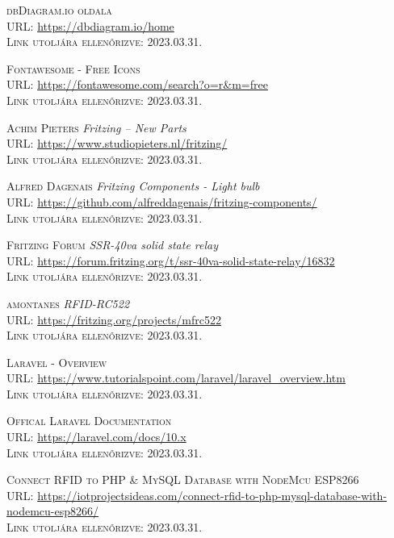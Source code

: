 \documentclass[
]{thesis-ekf}
\theoremstyle{definition}
\theoremstyle{remark}
\begin{document}
\begin{thebibliography}{20}
		\textsc{dbDiagram.io oldala}\\
		\textsc{URL:} \url{https://dbdiagram.io/home}\\
		\textsc{Link utoljára ellenőrizve:} 2023.03.31.
		
		\textsc{Fontawesome - Free Icons}\\
		\textsc{URL:} \url{https://fontawesome.com/search?o=r&m=free}\\
		\textsc{Link utoljára ellenőrizve:} 2023.03.31.
		
		\textsc{Achim Pieters} \emph{Fritzing – New Parts}\\
		\textsc{URL:} \url{https://www.studiopieters.nl/fritzing/}\\
		\textsc{Link utoljára ellenőrizve:} 2023.03.31.
		
		\textsc{Alfred Dagenais} \emph{Fritzing Components - Light bulb}\\
		\textsc{URL:} \url{https://github.com/alfreddagenais/fritzing-components/}\\
		\textsc{Link utoljára ellenőrizve:} 2023.03.31.
		
		\textsc{Fritzing Forum} \emph{SSR-40va solid state relay}\\
		\textsc{URL:} \url{https://forum.fritzing.org/t/ssr-40va-solid-state-relay/16832}\\
		\textsc{Link utoljára ellenőrizve:} 2023.03.31.
		
		\textsc{amontanes} \emph{RFID-RC522}\\
		\textsc{URL:} \url{https://fritzing.org/projects/mfrc522}\\
		\textsc{Link utoljára ellenőrizve:} 2023.03.31.
		
		\textsc{Laravel - Overview}\\
		\textsc{URL:} \url{https://www.tutorialspoint.com/laravel/laravel_overview.htm}\\
		\textsc{Link utoljára ellenőrizve:} 2023.03.31.
		
		\textsc{Offical Laravel Documentation}\\
		\textsc{URL:} \url{https://laravel.com/docs/10.x}\\
		\textsc{Link utoljára ellenőrizve:} 2023.03.31.
		
		\textsc{Connect RFID to PHP \& MySQL Database with NodeMcu ESP8266}\\
		\textsc{URL:} \url{https://iotprojectsideas.com/connect-rfid-to-php-mysql-database-with-nodemcu-esp8266/}\\
		\textsc{Link utoljára ellenőrizve:} 2023.03.31.
		

\end{thebibliography}
\end{document}
